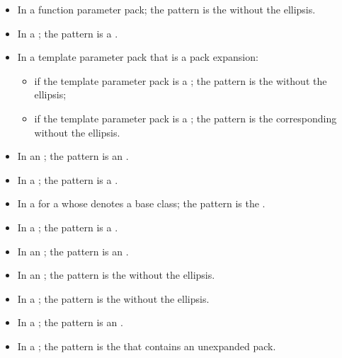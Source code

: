 \begin{itemize}
\item In a function parameter pack; the pattern is the
 without the ellipsis.

\item In a ;
the pattern is a .

\item In a template parameter pack that is a pack expansion:
\begin{itemize}
\item
if the template parameter pack is a ;
the pattern is the  without the ellipsis;

\item
if the template parameter pack is a ;
the pattern is the corresponding 
without the ellipsis.
\end{itemize}

\item In an ;
the pattern is an .

\item In a ;
the pattern is a .

\item In a  for a
 whose  denotes a
base class; the pattern is the .

\item In a ;
the pattern is a .

\item In an ; the pattern is
an .

\item In an ; the pattern is
the  without the ellipsis.

\item In a ; the pattern is
the  without the ellipsis.

\item In a ; the pattern is an
.

\item In a ;
the pattern is the 
that contains an unexpanded pack.
\end{itemize}

